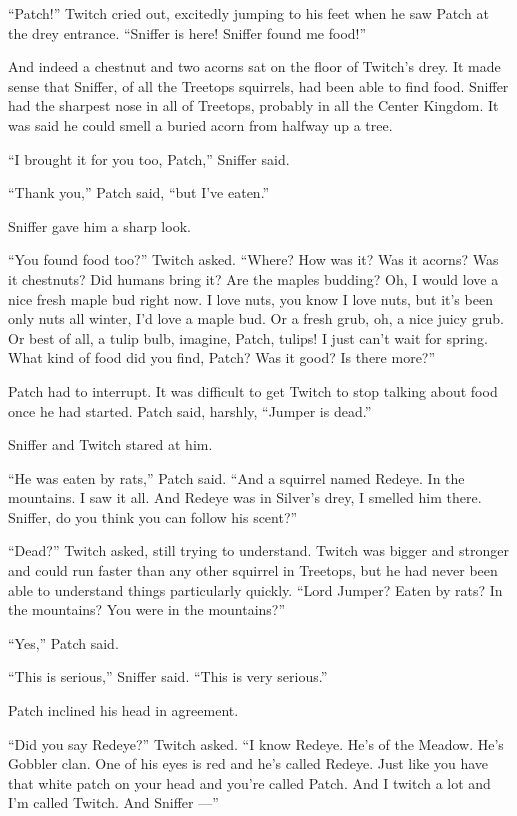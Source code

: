 \documentclass[12pt]{memoir}
\begin{document}
“Patch!” Twitch cried out, excitedly jumping to his feet when he saw
Patch at the drey entrance. “Sniffer is here! Sniffer found me food!”

And indeed a chestnut and two acorns sat on the floor of Twitch’s
drey. It made sense that Sniffer, of all the Treetops squirrels, had
been able to find food. Sniffer had the sharpest nose in all of
Treetops, probably in all the Center Kingdom. It was said he could
smell a buried acorn from halfway up a tree.

“I brought it for you too, Patch,” Sniffer said.

“Thank you,” Patch said, “but I’ve eaten.”

Sniffer gave him a sharp look.

“You found food too?” Twitch asked. “Where? How was it? Was it acorns?
Was it chestnuts? Did humans bring it? Are the maples budding?  Oh, I
would love a nice fresh maple bud right now. I love nuts, you know I
love nuts, but it’s been only nuts all winter, I’d love a maple
bud. Or a fresh grub, oh, a nice juicy grub. Or best of all, a tulip
bulb, imagine, Patch, tulips! I just can’t wait for spring. What kind
of food did you find, Patch? Was it good? Is there more?”

Patch had to interrupt. It was difficult to get Twitch to stop talking
about food once he had started. Patch said, harshly, “Jumper is dead.”

Sniffer and Twitch stared at him.

“He was eaten by rats,” Patch said. “And a squirrel named Redeye. In
the mountains. I saw it all. And Redeye was in Silver’s drey, I
smelled him there. Sniffer, do you think you can follow his scent?”

“Dead?” Twitch asked, still trying to understand. Twitch was bigger
and stronger and could run faster than any other squirrel in Treetops,
but he had never been able to understand things particularly
quickly. “Lord Jumper? Eaten by rats? In the mountains? You were in
the mountains?”

“Yes,” Patch said.

“This is serious,” Sniffer said. “This is very serious.”

Patch inclined his head in agreement.

“Did you say Redeye?” Twitch asked. “I know Redeye. He’s of the
Meadow. He’s Gobbler clan. One of his eyes is red and he’s called
Redeye. Just like you have that white patch on your head and you’re
called Patch. And I twitch a lot and I’m called Twitch. And Sniffer —”
\end{document}
